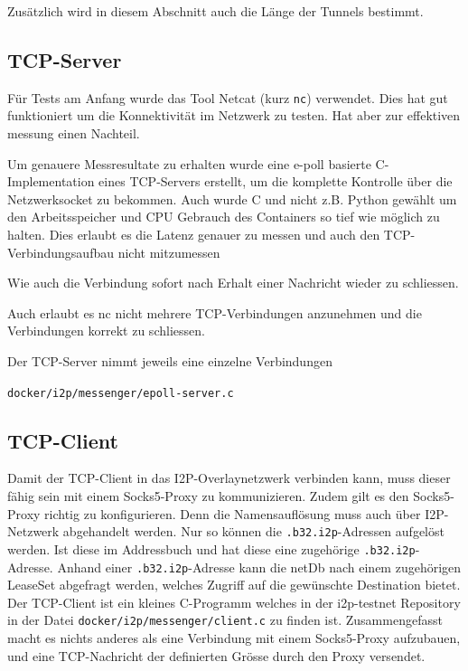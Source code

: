 Zusätzlich wird in diesem Abschnitt auch die Länge der Tunnels bestimmt.

\subsection{TCP-Server}

Für Tests am Anfang wurde das Tool Netcat (kurz \lstinline|nc|) verwendet.
Dies hat gut funktioniert um die Konnektivität im Netzwerk zu testen. Hat aber zur effektiven messung einen Nachteil.

Um genauere Messresultate zu erhalten wurde eine e-poll basierte C-Implementation eines TCP-Servers erstellt, um die komplette Kontrolle über die Netzwerksocket zu bekommen.
Auch wurde C und nicht z.B. Python gewählt um den Arbeitsspeicher und CPU Gebrauch des Containers so tief wie möglich zu halten.
Dies erlaubt es die Latenz genauer zu messen und auch den TCP-Verbindungsaufbau nicht mitzumessen

Wie auch die Verbindung sofort nach Erhalt einer Nachricht wieder zu schliessen.

Auch erlaubt es nc nicht mehrere TCP-Verbindungen anzunehmen und die Verbindungen korrekt zu schliessen.

Der TCP-Server nimmt jeweils eine einzelne Verbindungen


\lstinline|docker/i2p/messenger/epoll-server.c|


\subsection{TCP-Client}

Damit der TCP-Client in das I2P-Overlaynetzwerk verbinden kann, muss dieser fähig sein mit einem Socks5-Proxy zu kommunizieren.
Zudem gilt es den Socks5-Proxy richtig zu konfigurieren.
Denn die Namensauflösung muss auch über I2P-Netzwerk abgehandelt werden.
Nur so können die \lstinline|.b32.i2p|-Adressen aufgelöst werden.
Ist diese im Addressbuch und hat diese eine zugehörige \lstinline|.b32.i2p|-Adresse.
Anhand einer \lstinline|.b32.i2p|-Adresse kann die netDb nach einem zugehörigen LeaseSet abgefragt werden, welches Zugriff auf die gewünschte Destination bietet.
Der TCP-Client ist ein kleines C-Programm welches in der 
i2p-testnet Repository in der Datei \lstinline|docker/i2p/messenger/client.c| zu finden ist.
Zusammengefasst macht es nichts anderes als
eine Verbindung mit einem Socks5-Proxy aufzubauen, und eine TCP-Nachricht der definierten Grösse durch den Proxy versendet.

